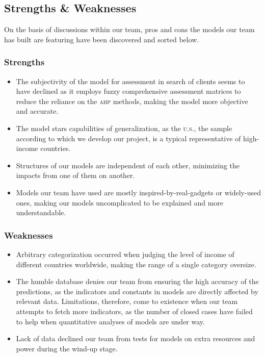 \documentclass[12pt]{article}
\begin{document}
\subsection{Strengths \& Weaknesses}

On the basis of discussions within our team, pros and cons the models our team has built are featuring have been discovered and sorted below.

\subsubsection{Strengths}
\begin{itemize}
	\item The subjectivity of the model for assessment in search of clients seems to have declined as it employs fuzzy comprehensive assessment matrices to reduce the reliance on the \textsc{ahp} methods, making the model more objective and accurate.
	\item The model stars capabilities of generalization, as the \textsc{u.s.}, the sample according to which we develop our project, is a typical representative of high-income countries.
	\item Structures of our models are independent of each other, minimizing the impacts from one of them on another.
	\item Models our team have used are mostly inspired-by-real-gadgets or widely-used ones, making our models uncomplicated to be explained and more understandable.
\end{itemize}
\subsubsection{Weaknesses}
\begin{itemize}
	\item Arbitrary categorization occurred when judging the level of income of different countries worldwide, making the range of a single category oversize.
	\item The humble database denies our team from ensuring the high accuracy of the predictions, as the indicators and constants in models are directly affected by relevant data. Limitations, therefore, come to existence when our team attempts to fetch more indicators, as the number of closed cases have failed to help when quantitative analyses of models are under way.
	\item Lack of data declined our team from tests for models on extra resources and power during the wind-up stage.
\end{itemize}
\clearpage
\end{document}
